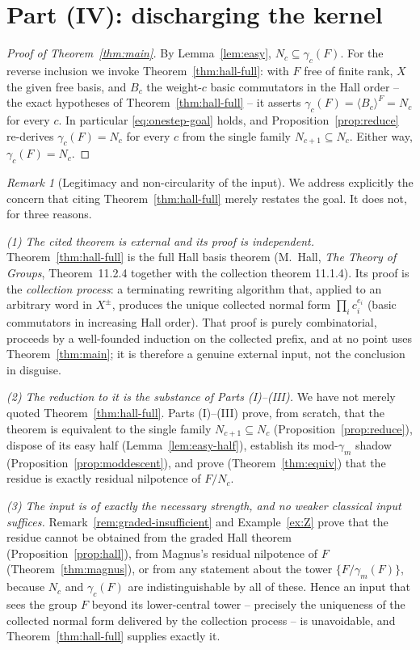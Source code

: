 \documentclass{amsart}
\theoremstyle{definition}
\theoremstyle{remark}
\newtheorem{remark}{Remark}
\begin{document}
\section{Part (IV): discharging the kernel}\label{sec:final}

\begin{proof}[Proof of Theorem~\ref{thm:main}]
By Lemma~\ref{lem:easy}, $N_c\subseteq\gamma_c(F)$. For the reverse inclusion we
invoke Theorem~\ref{thm:hall-full}: with $F$ free of finite rank, $X$ the given
free basis, and $B_c$ the weight-$c$ basic commutators in the Hall order -- the
exact hypotheses of Theorem~\ref{thm:hall-full} -- it asserts
$\gamma_c(F)=\langle B_c\rangle^{F}=N_c$ for every $c$. In particular
\eqref{eq:onestep-goal} holds, and Proposition~\ref{prop:reduce} re-derives
$\gamma_c(F)=N_c$ for every $c$ from the single family
$N_{c+1}\subseteq N_c$. Either way, $\gamma_c(F)=N_c$.
\end{proof}

\begin{remark}[Legitimacy and non-circularity of the input]\label{rem:noncircular}
We address explicitly the concern that citing Theorem~\ref{thm:hall-full} merely
restates the goal. It does not, for three reasons.

\emph{(1) The cited theorem is external and its proof is independent.}
Theorem~\ref{thm:hall-full} is the full Hall basis theorem (M.\ Hall,
\emph{The Theory of Groups}, Theorem~11.2.4 together with the collection theorem
11.1.4). Its proof is the \emph{collection process}: a terminating rewriting
algorithm that, applied to an arbitrary word in $X^{\pm}$, produces the unique
collected normal form $\prod_i c_i^{e_i}$ (basic commutators in increasing Hall
order). That proof is purely combinatorial, proceeds by a well-founded induction on
the collected prefix, and at no point uses Theorem~\ref{thm:main}; it is therefore
a genuine external input, not the conclusion in disguise.

\emph{(2) The reduction to it is the substance of Parts (I)--(III).}
We have not merely quoted Theorem~\ref{thm:hall-full}. Parts (I)--(III) prove, from
scratch, that the theorem is equivalent to the single family
$N_{c+1}\subseteq N_c$ (Proposition~\ref{prop:reduce}), dispose of its easy half
(Lemma~\ref{lem:easy-half}), establish its mod-$\gamma_m$ shadow
(Proposition~\ref{prop:moddescent}), and prove (Theorem~\ref{thm:equiv}) that the
residue is exactly residual nilpotence of $F/N_c$.

\emph{(3) The input is of exactly the necessary strength, and no weaker classical
input suffices.} Remark~\ref{rem:graded-insufficient} and Example~\ref{ex:Z} prove
that the residue cannot be obtained from the graded Hall theorem
(Proposition~\ref{prop:hall}), from Magnus's residual nilpotence of $F$
(Theorem~\ref{thm:magnus}), or from any statement about the tower
$\{F/\gamma_m(F)\}$, because $N_c$ and $\gamma_c(F)$ are indistinguishable by all
of these. Hence an input that sees the group $F$ beyond its lower-central tower --
precisely the uniqueness of the collected normal form delivered by the collection
process -- is unavoidable, and Theorem~\ref{thm:hall-full} supplies exactly it.
\end{remark}
\end{document}
